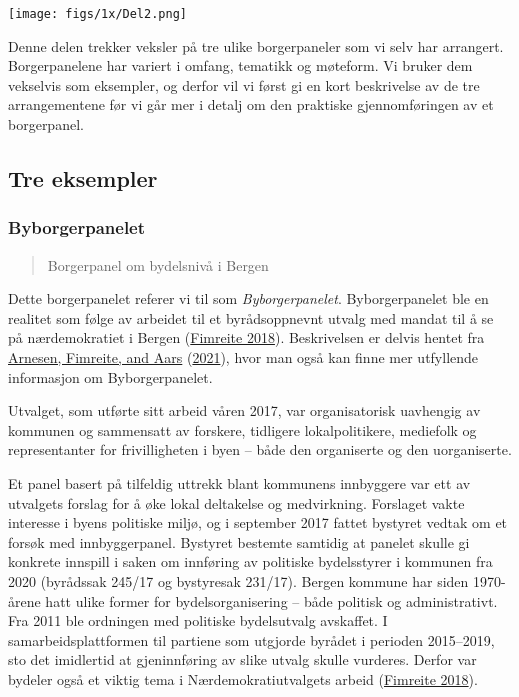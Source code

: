 \documentclass[
  12pt,
  a4paper, 12pt]{article}
\begin{document}
\texttt{[image: figs/1x/Del2.png]}

Denne delen trekker veksler på tre ulike borgerpaneler som vi selv har arrangert. Borgerpanelene har variert i omfang, tematikk og møteform. Vi bruker dem vekselvis som eksempler, og derfor vil vi først gi en kort beskrivelse av de tre arrangementene før vi går mer i detalj om den praktiske gjennomføringen av et borgerpanel.

\newpage

\hypertarget{tre-eksempler}{%
\subsection{Tre eksempler}\label{tre-eksempler}}

\hypertarget{byborgerpanelet}{%
\subsubsection{Byborgerpanelet}\label{byborgerpanelet}}

\begin{quote}
Borgerpanel om bydelsnivå i Bergen
\end{quote}

Dette borgerpanelet referer vi til som \emph{Byborgerpanelet}. Byborgerpanelet ble en realitet som følge av arbeidet til et byrådsoppnevnt utvalg med mandat til å se på nærdemokratiet i Bergen (\protect\hyperlink{ref-fimreitebyen}{Fimreite 2018}). Beskrivelsen er delvis hentet fra \protect\hyperlink{ref-arnesenloddet}{Arnesen, Fimreite, and Aars} (\protect\hyperlink{ref-arnesenloddet}{2021}), hvor man også kan finne mer utfyllende informasjon om Byborgerpanelet.

Utvalget, som utførte sitt arbeid våren 2017, var organisatorisk uavhengig av kommunen og sammensatt av forskere, tidligere lokalpolitikere, mediefolk og representanter for frivilligheten i byen -- både den organiserte og den uorganiserte.

Et panel basert på tilfeldig uttrekk blant kommunens innbyggere var ett av utvalgets forslag for å øke lokal deltakelse og medvirkning. Forslaget vakte interesse i byens politiske miljø, og i september 2017 fattet bystyret vedtak om et forsøk med innbyggerpanel. Bystyret bestemte samtidig at panelet skulle gi konkrete innspill i saken om innføring av politiske bydelsstyrer i kommunen fra 2020 (byrådssak 245/17 og bystyresak 231/17). Bergen kommune har siden 1970-årene hatt ulike former for bydelsorganisering -- både politisk og administrativt. Fra 2011 ble ordningen med politiske bydelsutvalg avskaffet. I samarbeidsplattformen til partiene som utgjorde byrådet i perioden 2015--2019, sto det imidlertid at gjeninnføring av slike utvalg skulle vurderes. Derfor var bydeler også et viktig tema i Nærdemokratiutvalgets arbeid (\protect\hyperlink{ref-fimreitebyen}{Fimreite 2018}).
\end{document}
